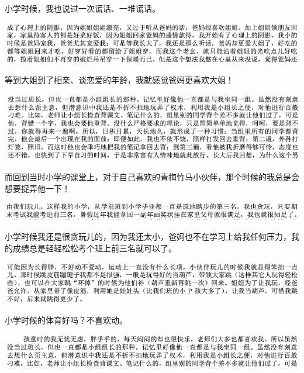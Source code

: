 \documentclass[9pt, b5paper]{article}
\begin{document}
小学时候，我也说过一次谎话、一堆谎话。

\begin{center}
\includegraphics[width=.9\linewidth]{./pic/backups_plans_20210422_101254.png}
\end{center}

等到大姐到了相亲、谈恋爱的年龄，我就感觉爸妈更喜欢大姐！

\begin{center}
\includegraphics[width=.9\linewidth]{./pic/backups_plans_20210422_074914.png}
\end{center}

而回到当时小学的课堂上，对于自己喜欢的青梅竹马小伙伴，那个时候的我总是会想要捉弄他一下！

\begin{center}
\includegraphics[width=.9\linewidth]{./pic/backups_plans_20210422_100606.png}
\end{center}

小学时候我还是很贪玩儿的，因为我还太小，爸妈也不在学习上给我任何压力，我的成绩总是轻轻松松考个班上前三名就可以了。

\begin{center}
\includegraphics[width=.9\linewidth]{./pic/backups_plans_20210422_100644.png}
\end{center}

小学时候的体育好吗？不喜欢动。

\begin{center}
\includegraphics[width=.9\linewidth]{./pic/backups_plans_20210422_100732.png}
\end{center}
\end{document}

